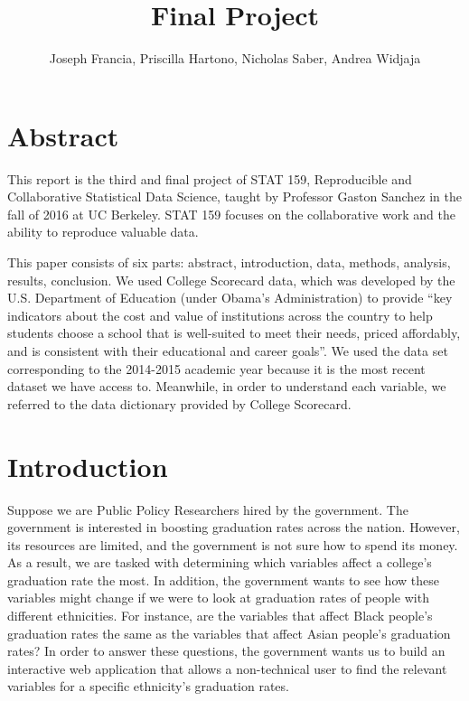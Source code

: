 \documentclass{article}
\begin{document}



\title{Final Project}
\author{Joseph Francia, Priscilla Hartono, Nicholas Saber, Andrea Widjaja}
\maketitle

\section{Abstract}
This report is the third and final project of STAT 159, Reproducible and Collaborative Statistical Data Science, taught by Professor Gaston Sanchez in the fall of 2016 at UC Berkeley. STAT 159 focuses on the collaborative work and the ability to reproduce valuable data.

This paper consists of six parts: abstract, introduction, data, methods, analysis, results, conclusion. We used College Scorecard data, which was developed by the U.S. Department of Education (under Obama’s Administration) to provide “key indicators about the cost and value of institutions across the country to help students choose a school that is well-suited to meet their needs, priced affordably, and is consistent with their educational and career goals”. We used the data set corresponding to the 2014-2015 academic year because it is the most recent dataset we have access to. Meanwhile, in order to understand each variable, we referred to the data dictionary provided by College Scorecard. 


\section{Introduction}
Suppose we are Public Policy Researchers hired by the government. The government is interested in boosting graduation rates across the nation. However, its resources are limited, and the government is not sure how to spend its money. As a result, we are tasked with determining which variables affect a college’s graduation rate the most. In addition, the government wants to see how these variables might change if we were to look at graduation rates of people with different ethnicities. For instance, are the variables that affect Black people's graduation rates the same as the variables that affect Asian people's graduation rates? In order to answer these questions, the government wants us to build an interactive web application that allows a non-technical user to find the relevant variables for a specific ethnicity's graduation rates. 
\end{document}
